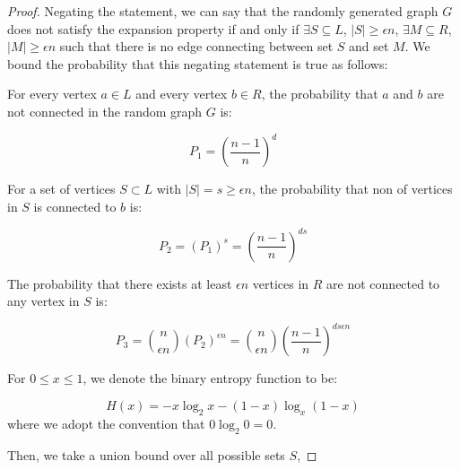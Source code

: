 \begin{proof}

Negating the statement, we can say that the randomly generated graph $G$ does not satisfy the expansion property if and only if $\exists S \subseteq L$, $|S| \ge \epsilon n$, $\exists M \subseteq R$, $|M| \ge  \epsilon n$ such that there is no edge connecting between set $S$ and set $M$. We bound the probability that this negating statement is true as follows:

For every vertex $a \in L$ and every vertex $b \in R$, the probability that $a$ and $b$ are not connected in the random graph $G$ is:

$$P_1 = (\frac{n-1}{n})^{d}$$

For a set of vertices $S \subset L$ with $|S| = s \ge \epsilon n$, the probability that non of vertices in $S$ is connected to $b$ is:

$$P_2 = (P_1)^s = (\frac{n-1}{n})^{d s}$$

The probability that there exists at least $\epsilon n$ vertices in $R$ are not connected to any vertex in $S$ is:

$$P_3 = \binom{n}{\epsilon n} (P_2)^{\epsilon n} = \binom{n}{\epsilon n} (\frac{n-1}{n})^{d s \epsilon n}$$

For $0 \le x \le 1$, we denote the binary entropy function to be:

$$H(x) = -x\log_2 x - (1-x)\log_x (1-x)$$ 
where we adopt the convention that $0 \log_2 0 = 0$.

Then, we take a union bound over all possible sets $S$, 


\end{proof}
